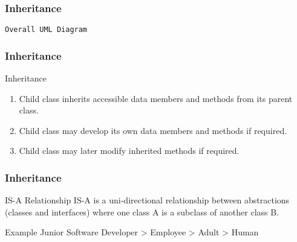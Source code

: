 \documentclass[10pt, compress]{beamer}
\begin{document}
\begin{frame}[fragile]
  \frametitle{Inheritance}
  \begin{block}{\texttt{Overall UML Diagram}}
  \begin{figure}
  \centering
  \end{figure}
  \end{block}
\end{frame}

\begin{frame}[fragile]
  \frametitle{Inheritance}
  \begin{block}{Inheritance}
    \begin{enumerate}
      \item Child class inherits accessible data members and methods from its parent class.
      \item Child class may develop its own data members and methods if required.
      \item Child class may later modify inherited methods if required.
    \end{enumerate}
  \end{block}
\end{frame}

\begin{frame}[fragile]
  \frametitle{Inheritance}
  \begin{block}{IS-A Relationship}
    \alert{IS-A} is a uni-directional relationship between abstractions (classes and interfaces) where one class A is a subclass of another class B.
  \end{block}
  \begin{block}{Example}
  Junior Software Developer > Employee > Adult > Human
  \end{block}
\end{frame}
\end{document}
